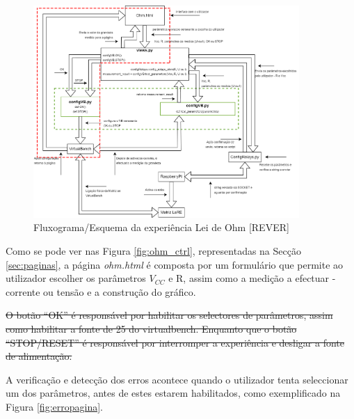 \begin{figure}[hbtp]
	\centering
	\includegraphics[width=0.9\textwidth]{figures/ohm_diagrama_ALT.png}
	\caption{Fluxograma/Esquema da experiência Lei de Ohm [REVER]}
	\label{fig:fluxohm}
\end{figure}




Como se pode ver nas Figura \ref{fig:ohm_ctrl}, representadas na Secção \ref{sec:paginas}, a página \textit{ohm.html} é composta por um formulário que permite ao utilizador escolher os parâmetros $V_{CC}$ e R, assim como a medição a efectuar - corrente ou tensão e a construção do gráfico.

\sout{O botão ``OK'' é responsável por habilitar os selectores de parâmetros, assim como habilitar a fonte de 25 do virtualbench. Enquanto que o botão ``STOP/RESET'' é responsável por interromper a experiência e desligar a fonte de alimentação.}

A verificação e detecção dos erros acontece quando o utilizador tenta seleccionar um dos parâmetros, antes de estes estarem habilitados, como exemplificado na Figura \ref{fig:erropagina}. 

